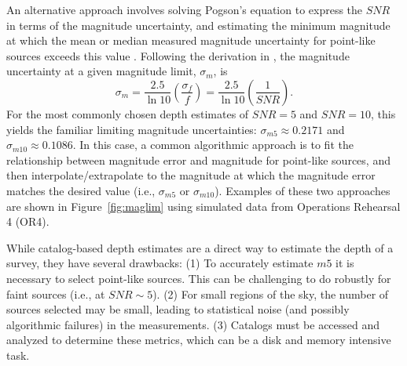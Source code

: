 \documentclass[DM,authoryear,toc]{lsstdoc}
\begin{document}
An alternative approach involves solving Pogson's equation \citep{Pogson:1856} to express the $SNR$ in terms of the magnitude uncertainty, and estimating the minimum magnitude at which the mean or median measured magnitude uncertainty for point-like sources exceeds this value \citep{Rykoff:2015}. Following the derivation in \citet{Rykoff:2015}, the magnitude uncertainty at a given magnitude limit, $\sigma_m$, is 
\begin{equation}
\sigma_m = \frac{2.5}{\ln 10} \left(\frac{\sigma_f}{f} \right) = \frac{2.5}{\ln 10} \left(\frac{1}{SNR}\right).
\end{equation}
For the most commonly chosen depth estimates of $SNR = 5$ and $SNR = 10$, this yields the familiar limiting magnitude uncertainties: $\sigma_{m5} \approx 0.2171$ and $\sigma_{m10} \approx 0.1086$. In this case, a common algorithmic approach is to fit the relationship between magnitude error and magnitude for point-like sources, and then interpolate/extrapolate to the magnitude at which the magnitude error matches the desired value (i.e., $\sigma_{m5}$ or $\sigma_{m10}$).
Examples of these two approaches are shown in Figure~\ref{fig:maglim} using simulated data from Operations Rehearsal 4 (OR4).

While catalog-based depth estimates are a direct way to estimate the depth of a survey, they have several drawbacks: (1) To accurately estimate $m5$ it is necessary to select point-like sources. This can be challenging to do robustly for faint sources (i.e., at ${SNR} \sim 5$). (2) For small regions of the sky, the number of sources selected may be small, leading to statistical noise (and possibly algorithmic failures) in the measurements. (3) Catalogs must be accessed and analyzed to determine these metrics, which can be a disk and memory intensive task. 
\end{document}
